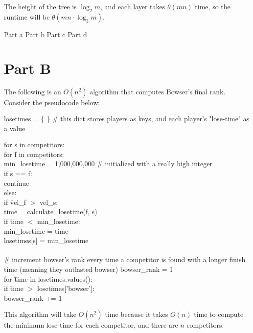 \documentclass[12pt,twoside]{article}
\begin{document}
\begin{problems}
\begin{problemparts}
The height of the tree is $\log_2 m$, and each layer takes $\theta(mn)$ time, so the runtime will be $\theta(mn \cdot \log_2 m)$.



\end{problemparts}


\problem  %

\begin{problemparts}
\problempart Part a %
\problempart Part b %
\problempart Part c %
\problempart Part d %
\end{problemparts}

\section*{Part B}

\problem
\begin{problemparts}
\problempart The following is an $O(n^2)$ algorithm that computes Bowser's final rank. Consider the pseudocode below:
\bigskip

losetimes =  \{ \}  \# this dict stores players as keys, and each player's "lose-time" as a value

\begin{tabbing}
for \= s in competitors: \\
	\> for \= f in competitors: \\
		\>\> min\_losetime = 1,000,000,000  \# initialized with a really high integer \\
		\>\> if \= s == f:\\
			\>\>\> continue\\
		\>\>else:\\
			\>\>\>if \=vel\_f $>$ vel\_s:\\
				\>\>\>\>time = calculate\_losetime(f, s)\\
				\>\>\>\>if \= time $<$ min\_losetime:\\
					\>\>\>\>\>min\_losetime = time\\
	\>losetimes[s] = min\_losetime\\
	\\
	\# increment bowser's rank every time a competitor is found with a longer finish time (meaning they outlasted bowser)
	bowser\_rank = 1\\
	for \=time in losetimes.values():\\
		\>if \=time $>$ losetimes['bowser']:\\
			\>\>bowser\_rank += 1\\
\end{tabbing}
\smallskip
This algorithm will take $O(n^2)$ time because it takes $O(n)$ time to compute the minimum lose-time for each competitor, and there are $n$ competitors. 



\end{problemparts}
\end{problems}
\end{document}

